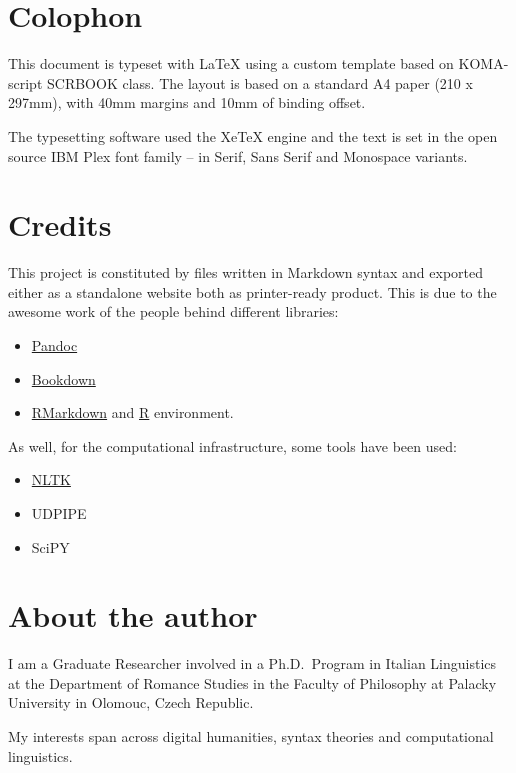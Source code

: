 \documentclass[a4paper,twoside,12pt,chapterprefix=false,bibliography=totocnumbered,listof=flat]{scrbook}
\providecommand{\tightlist}{%
  \setlength{\itemsep}{0pt}\setlength{\parskip}{0pt}}
\begin{document}
\section{Colophon}\label{colophon}

This document is typeset with LaTeX using a custom template based on
KOMA-script SCRBOOK class. The layout is based on a standard A4 paper
(210 x 297mm), with 40mm margins and 10mm of binding offset.

The typesetting software used the XeTeX engine and the text is set in
the open source IBM Plex font family -- in Serif, Sans Serif and
Monospace variants.

\section{Credits}\label{credits}

This project is constituted by files written in Markdown syntax and
exported either as a standalone website both as printer-ready product.
This is due to the awesome work of the people behind different
libraries:

\begin{itemize}
\tightlist
\item
  \href{https://bookdown.org}{Pandoc}
\item
  \href{https://bookdown.org}{Bookdown}
\item
  \href{https://bookdown.org}{RMarkdown} and
  \href{https://bookdown.org}{R} environment.
\end{itemize}

As well, for the computational infrastructure, some tools have been
used:

\begin{itemize}
\tightlist
\item
  \href{https://bookdown.org}{NLTK}
\item
  UDPIPE
\item
  SciPY
\end{itemize}

\section{About the author}\label{about-the-author}

I am a Graduate Researcher involved in a Ph.D.~Program in Italian
Linguistics at the Department of Romance Studies in the Faculty of
Philosophy at Palacky University in Olomouc, Czech Republic.

My interests span across digital humanities, syntax theories and
computational linguistics.
\end{document}
